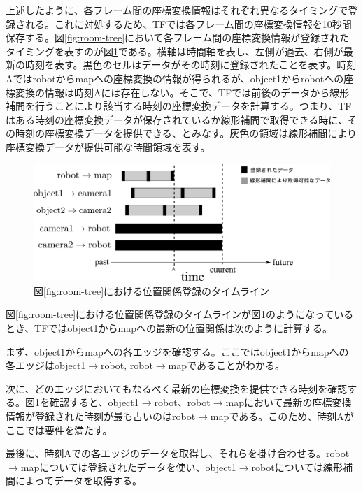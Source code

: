 \documentclass[a4paper]{jreport}	%
\begin{document}
上述したように、各フレーム間の座標変換情報はそれぞれ異なるタイミングで登録される。これに対処するため、TFでは各フレーム間の座標変換情報を10秒間保存する。図\ref{fig:room-tree}において各フレーム間の座標変換情報が登録されたタイミングを表すのが図\ref{fig:room-timeline}である。横軸は時間軸を表し、左側が過去、右側が最新の時刻を表す。黒色のセルはデータがその時刻に登録されたことを表す。時刻Aではrobotからmapへの座標変換の情報が得られるが、object1からrobotへの座標変換の情報は時刻Aには存在しない。そこで、TFでは前後のデータから線形補間を行うことにより該当する時刻の座標変換データを計算する。つまり、TFはある時刻の座標変換データが保存されているか線形補間で取得できる時に、その時刻の座標変換データを提供できる、とみなす。灰色の領域は線形補間により座標変換データが提供可能な時間領域を表す。

\begin{figure}[h] 
\centering
\includegraphics[width=15cm]{room-timeline}	
\caption{図\ref{fig:room-tree}における位置関係登録のタイムライン}
\label{fig:room-timeline}
\end{figure}

図\ref{fig:room-tree}における位置関係登録のタイムラインが図\ref{fig:room-timeline}のようになっているとき、TFではobject1からmapへの最新の位置関係は次のように計算する。

まず、object1からmapへの各エッジを確認する。ここではobject1からmapへの各エッジはobject1$\rightarrow$robot, robot$\rightarrow$mapであることがわかる。

次に、どのエッジにおいてもなるべく最新の座標変換を提供できる時刻を確認する。図\ref{fig:room-timeline}を確認すると、object1$\rightarrow$robot、robot$\rightarrow$mapにおいて最新の座標変換情報が登録された時刻が最も古いのはrobot$\rightarrow$mapである。このため、時刻Aがここでは要件を満たす。

最後に、時刻Aでの各エッジのデータを取得し、それらを掛け合わせる。robot$\rightarrow$mapについては登録されたデータを使い、object1$\rightarrow$robotについては線形補間によってデータを取得する。
\end{document}
